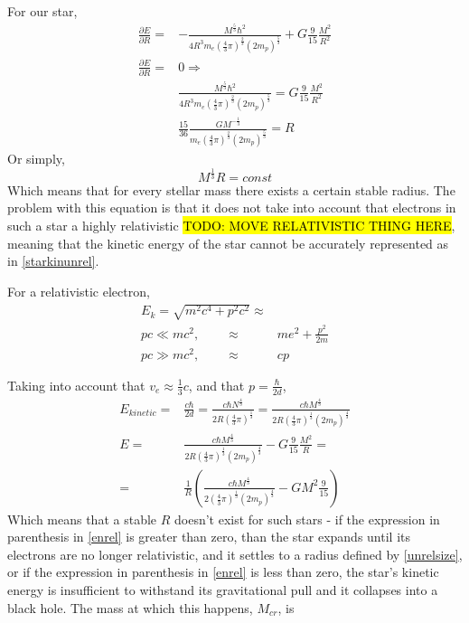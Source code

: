 			For our star,
			\begin{align}
				\frac{\partial E}{\partial R} =& - \frac{M^{\frac{5}{3}}\hbar^2}{4R^3m_e(\frac{4}{3}\pi)^{\frac{2}{3}}(2m_p)^{\frac{5}{3}}} + G \frac{9}{15} \frac{M^2}{R^2} \\
				\frac{\partial E}{\partial R} =& 0 \Rightarrow \\
				&\frac{M^{\frac{5}{3}}\hbar^2}{4R^3m_e(\frac{4}{3}\pi)^{\frac{2}{3}}(2m_p)^{\frac{5}{3}}} = G \frac{9}{15} \frac{M^2}{R^2} \\
				&\frac{15}{36}\frac{GM^{-\frac{1}{3}}}{m_e(\frac{4}{3}\pi)^{\frac{2}{3}}(2m_p)^{\frac{5}{3}}} = R
			\end{align}
			Or simply, 
			\begin{equation}
				M^{\frac{1}{3}} R = const
				\label{unrelsize}
			\end{equation}
			Which means that for every stellar mass there exists a certain stable radius. The problem with this equation is that it does not take into account that electrons in such a star a highly relativistic \hl{TODO: MOVE RELATIVISTIC THING HERE}, meaning that the kinetic energy of the star cannot be accurately represented as in \ref{starkinunrel}. 	
			
			For a relativistic electron, 
			\begin{align}
				E_k = \sqrt{m^2c^4+p^2c^2} \approx& \\
				pc \ll mc^2, \qquad \approx& me^2 + \frac{p^2}{2m} \\
				pc \gg mc^2, \qquad \approx& cp
			\end{align}
			
			Taking into account that $v_e \approx \frac{1}{3}c$, and that $p = \frac{\hbar}{2d}$,
			\begin{align}
				E_{kinetic} =& \frac{c\hbar}{2d} = \frac{c\hbar N^{\frac{4}{3}}}{2 R (\frac{4}{3}\pi)^{\frac{1}{3}}} = \frac{c \hbar M^{\frac{4}{3}}}{2 R (\frac{4}{3}\pi)^{\frac{1}{3}}(2m_p)^{\frac{4}{3}}} \\
				E =& \frac{c \hbar M^{\frac{4}{3}}}{2 R (\frac{4}{3}\pi)^{\frac{1}{3}}(2m_p)^{\frac{4}{3}}} -G \frac{9}{15} \frac{M^2}{R}  =\\
				=& \frac{1}{R}(\frac{c \hbar M^{\frac{4}{3}}}{2 (\frac{4}{3}\pi)^{\frac{1}{3}}(2m_p)^{\frac{4}{3}}} -G M^2 \frac{9}{15}) \label{enrel}
			\end{align}
			Which means that a stable $R$ doesn't exist for such stars - if the expression in parenthesis in \ref{enrel} is greater than zero, than the star expands until its electrons are no longer relativistic, and it settles to a radius defined by \ref{unrelsize}, or if the expression in parenthesis in \ref{enrel} is less than zero, the star's kinetic energy is insufficient to withstand its gravitational pull and it collapses into a black hole.
			The mass at which this happens, $M_{cr}$, is
			
